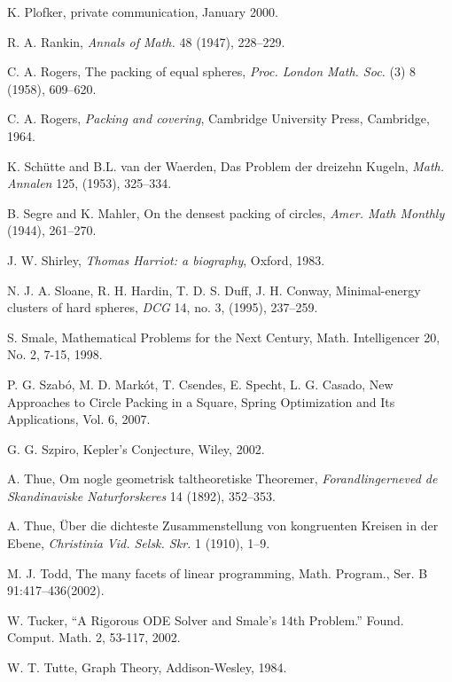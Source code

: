 \begin{thebibliography}{CHMS94}
  K. Plofker, private communication, January 2000.

 R. A. Rankin, {\it Annals of Math.} 48 (1947), 228--229.


 C. A. Rogers, The packing of equal spheres, {\it Proc. London Math.
    Soc.} (3) 8 (1958), 609--620.

 C. A. Rogers, {\it Packing and covering}, Cambridge University Press,
    Cambridge, 1964.

 K. Sch\"utte and B.L. van der Waerden, Das
Problem der dreizehn Kugeln, {\it Math. Annalen} 125, (1953),
325--334.

 B. Segre and K. Mahler, On the densest packing of
    circles, {\it Amer. Math Monthly} (1944), 261--270.

 J. W. Shirley,
{\it Thomas Harriot: a biography}, Oxford, 1983.

 N. J. A. Sloane, R. H. Hardin, T. D. S. Duff, J. H. Conway,
    Minimal-energy clusters of hard spheres,
    {\it DCG} 14,  no. 3, (1995), 237--259.

 S. Smale, 
   Mathematical Problems for the Next Century, Math. Intelligencer 20, No. 2, 7-15, 1998.
   
 P. G. Szab\'o, M. D. Mark\'ot, T. Csendes,
E. Specht, L. G. Casado, New Approaches to Circle Packing in a Square,
Spring Optimization and Its Applications, Vol. 6, 2007.

 G. G. Szpiro, Kepler's Conjecture, Wiley, 2002.

 A. Thue, Om nogle geometrisk taltheoretiske Theoremer,
    {\it Forandlingerneved de Skandinaviske Naturforskeres} 14 (1892), 352--353.

 A. Thue, \"Uber die dichteste Zusammenstellung von
    kongruenten Kreisen in der Ebene, {\it Christinia Vid. Selsk. Skr.} 1
    (1910), 1--9.

 M. J. Todd, The many facets of linear programming,
Math. Program., Ser. B 91:417--436(2002). 

  W. Tucker, ``A Rigorous ODE Solver and Smale's 14th Problem.'' 
   Found. Comput. Math. 2, 53-117, 2002.

 W. T. Tutte, Graph Theory, Addison-Wesley, 1984.


\end{thebibliography}
